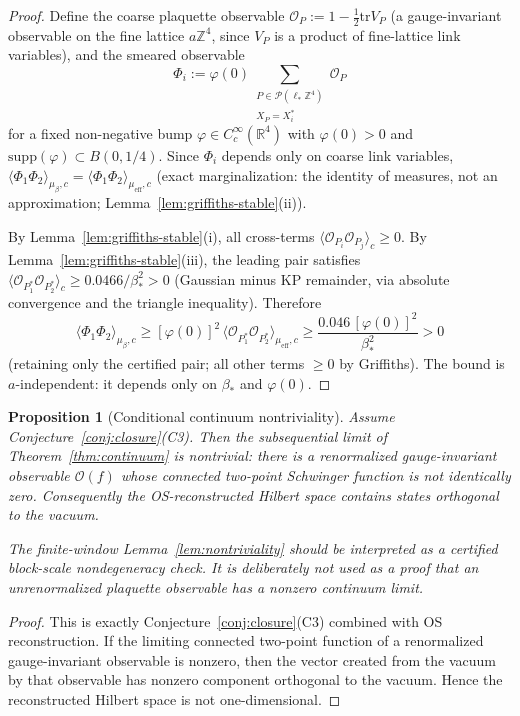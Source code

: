 \documentclass[11pt]{article}
\newtheorem{proposition}[theorem]{Proposition}
\theoremstyle{definition}
\newcommand{\tr}{\mathrm{tr}}
\newcommand{\R}{\mathbb{R}}
\newcommand{\Z}{\mathbb{Z}}
\begin{document}
\begin{proof}
Define the coarse plaquette observable
$\mathcal{O}_P:=1-\frac{1}{2}\tr V_P$
(a gauge-invariant observable on the fine lattice $a\Z^4$,
since $V_P$ is a product of fine-lattice link variables),
and the smeared observable
\begin{equation}\label{eq:Phi-def}
\Phi_i:=\varphi(0)\sum_{\substack{P\in\mathcal{P}(\ell_*\Z^4)\\
X_P=X_i^*}}\mathcal{O}_P
\end{equation}
for a fixed non-negative bump $\varphi\in C_c^\infty(\R^4)$
with $\varphi(0)>0$ and $\mathrm{supp}(\varphi)\subset B(0,1/4)$.
Since $\Phi_i$ depends only on coarse link variables,
$\langle\Phi_1\Phi_2\rangle_{\mu_\beta,c}
=\langle\Phi_1\Phi_2\rangle_{\mu_{\mathrm{eff}},c}$
(exact marginalization: the identity of measures, not an
approximation; Lemma~\ref{lem:griffiths-stable}(ii)).

By Lemma~\ref{lem:griffiths-stable}(i), all cross-terms
$\langle\mathcal{O}_{P_i}\mathcal{O}_{P_j}\rangle_c\ge 0$.
By Lemma~\ref{lem:griffiths-stable}(iii), the leading pair
satisfies $\langle\mathcal{O}_{P_1^*}\mathcal{O}_{P_2^*}
\rangle_c\ge 0.0466/\beta_*^2>0$
(Gaussian minus KP remainder, via absolute convergence
and the triangle inequality).
Therefore
\begin{equation}\label{eq:nontriviality-final}
\langle\Phi_1\Phi_2\rangle_{\mu_\beta,c}
\ge[\varphi(0)]^2\,
\langle\mathcal{O}_{P_1^*}\mathcal{O}_{P_2^*}
\rangle_{\mu_{\mathrm{eff}},c}
\ge\frac{0.046\,[\varphi(0)]^2}{\beta_*^2}>0
\end{equation}
(retaining only the certified pair; all other terms $\ge 0$
by Griffiths).
The bound is $a$-independent: it depends only on
$\beta_*$ and $\varphi(0)$.
\end{proof}


\begin{proposition}[Conditional continuum nontriviality]%
\label{prop:continuum-nontrivial}
Assume Conjecture~\ref{conj:closure}(C3).  Then the subsequential limit
of Theorem~\ref{thm:continuum} is nontrivial: there is a renormalized
gauge-invariant observable $\mathcal O(f)$ whose connected two-point
Schwinger function is not identically zero.  Consequently the
OS-reconstructed Hilbert space contains states orthogonal to the
vacuum.

The finite-window Lemma~\ref{lem:nontriviality} should be interpreted
as a certified block-scale nondegeneracy check.  It is deliberately not
used as a proof that an unrenormalized plaquette observable has a
nonzero continuum limit.
\end{proposition}
\begin{proof}
This is exactly Conjecture~\ref{conj:closure}(C3) combined with OS
reconstruction.  If the limiting connected two-point function of a
renormalized gauge-invariant observable is nonzero, then the vector
created from the vacuum by that observable has nonzero component
orthogonal to the vacuum.  Hence the reconstructed Hilbert space is not
one-dimensional.
\end{proof}
\end{document}
